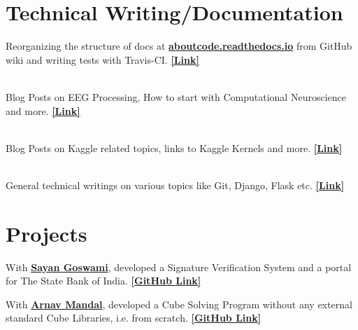 \documentclass[]{deedy-resume-openfont}
\begin{document}
\begin{minipage}[t]{0.66\textwidth} 


\section{Technical Writing/Documentation}
Reorganizing the structure of docs at \textbf{\href{https://aboutcode.readthedocs.io/en/latest/}{aboutcode.readthedocs.io}} from GitHub wiki and writing tests with Travis-CI. 
\textbf{\href{https://ayansinha.dev/2019/06/15/index-oss.html}{ [Link] }} 
\sectionsep

\\
Blog Posts on EEG Processing, How to start with Computational Neuroscience and more.
\textbf{\href{https://ayansinha.dev/2019/06/15/index-neuro.html}{ [Link] }} 
\sectionsep

\\
Blog Posts on Kaggle related topics, links to Kaggle Kernels and more.
\textbf{\href{https://ayansinha.dev/2019/06/15/index-kaggle.html}{ [Link] }} 
\sectionsep

\\
General technical writings on various topics like Git, Django, Flask etc.
\textbf{\href{https://ayansinha.dev/2019/06/15/index-tech-writing.html}{ [Link] }}
\sectionsep


\section{Projects}
With \textbf{\href{https://github.com/Sayan98}{Sayan Goswami}}, developed a Signature Verification System and a portal for The State Bank of India. \textbf{\href{https://github.com/AyanSinhaMahapatra/AutoSIGN}{ [GitHub Link] }}
\sectionsep

With \textbf{\href{https://github.com/arnav-mandal1234}{Arnav Mandal}}, developed a Cube Solving Program without any external standard Cube Libraries, i.e. from scratch. \textbf{\href{https://github.com/AyanSinhaMahapatra/CubeSolving}{ [GitHub Link] }}
\sectionsep


\end{minipage}
\end{document}
